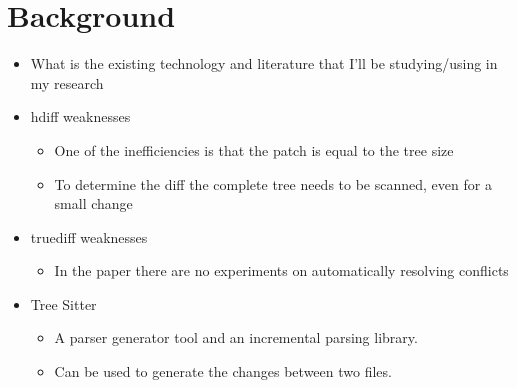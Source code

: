 \section{Background}
\begin{itemize}
    \item What is the existing technology and literature that I'll be studying/using in my research
    \item hdiff weaknesses
    \begin{itemize}
        \item One of the inefficiencies is that the patch is equal to the tree size
        \item To determine the diff the complete tree needs to be scanned, even for a small change
    \end{itemize}
    \item truediff weaknesses
    \begin{itemize}
        \item In the paper there are no experiments on automatically resolving conflicts
    \end{itemize}
    \item Tree Sitter
    \begin{itemize}
        \item A parser generator tool and an incremental parsing library.
        \item Can be used to generate the changes between two files.
    \end{itemize}
\end{itemize}
